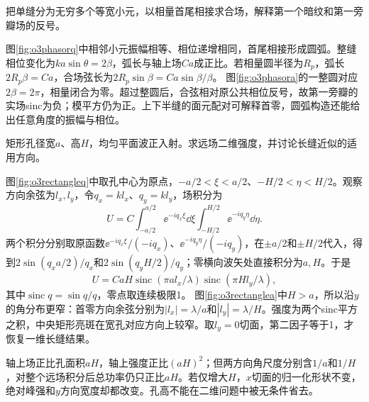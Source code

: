 \begin{example}\label{ex:o3phasor}
把单缝分为无穷多个等宽小元，以相量首尾相接求合场，解释第一个暗纹和第一旁瓣场的反号。
\end{example}
\begin{solution}
图\ref{fig:o3phasorq}中相邻小元振幅相等、相位递增相同，首尾相接形成圆弧。整缝相位变化为$ka\sin\theta=2\beta$，弧长与轴上场$Ca$成正比。若相量圆半径为$R_p$，弧长$2R_p\beta=Ca$，合场弦长为$2R_p\sin\beta=Ca\sin\beta/\beta$。
图\ref{fig:o3phasora}的一整圆对应$2\beta=2\pi$，相量闭合为零。超过整圆后，合弦相对原公共相位反号，故第一旁瓣的实场sinc为负；模平方仍为正。上下半缝的面元配对可解释首零，圆弧构造还能给出任意角度的振幅与相位。
\end{solution}

\begin{example}\label{ex:o3rectangle}
矩形孔径宽$a$、高$H$，均匀平面波正入射。求远场二维强度，并讨论长缝近似的适用方向。
\end{example}
\begin{solution}
图\ref{fig:o3rectangleq}中取孔中心为原点，$-a/2<\xi<a/2$、$-H/2<\eta<H/2$。观察方向余弦为$l_x,l_y$，令$q_x=kl_x$、$q_y=kl_y$，场积分为
\[
 U=C\int_{-a/2}^{a/2}\ee^{-iq_x\xi}\dd\xi
 \int_{-H/2}^{H/2}\ee^{-iq_y\eta}\dd\eta.
\]
两个积分分别取原函数$\ee^{-iq_x\xi}/(-iq_x)$、$\ee^{-iq_y\eta}/(-iq_y)$，在$\pm a/2$和$\pm H/2$代入，得到$2\sin(q_xa/2)/q_x$和$2\sin(q_yH/2)/q_y$；零横向波矢处直接积分为$a,H$。于是
\[
 U=CaH\operatorname{sinc}(\pi a l_x/\lambda)
 \operatorname{sinc}(\pi H l_y/\lambda),
\]
其中$\operatorname{sinc}q=\sin q/q$，零点取连续极限1。
图\ref{fig:o3rectanglea}中$H>a$，所以沿$y$的角分布更窄：首零方向余弦分别为$|l_x|=\lambda/a$和$|l_y|=\lambda/H$。强度为两个sinc平方之积，中央矩形亮斑在宽孔对应方向上较窄。取$l_y=0$切面，第二因子等于1，才恢复一维长缝结果。

轴上场正比孔面积$aH$，轴上强度正比$(aH)^2$；但两方向角尺度分别含$1/a$和$1/H$，对整个远场积分后总功率仍只正比$aH$。若仅增大$H$，$x$切面的归一化形状不变，绝对峰强和$y$方向宽度却都改变。孔高不能在二维问题中被无条件省去。
\end{solution}

